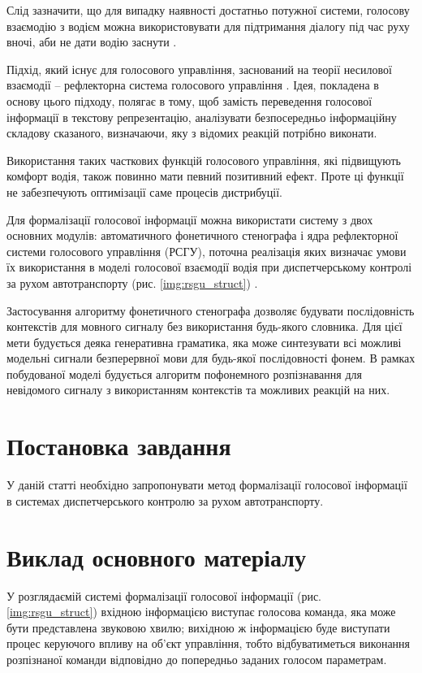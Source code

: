 Слід зазначити, що для випадку наявності достатньо потужної системи, голосову взаємодію з водієм можна використовувати для підтримання діалогу під час руху вночі, аби не дати водію заснути \cite{Kravchenko_2012}.

Підхід, який існує для голосового управління, заснований на теорії несилової взаємодії \cite{Teslia_2010} – рефлекторна система голосового управління \cite{Egorchenkov_2016,Pylypenko_2009}. Ідея, покладена в основу цього підходу, полягає в тому, щоб замість переведення голосової інформації в текстову репрезентацію, аналізувати безпосередньо інформаційну складову сказаного, визначаючи, яку з відомих реакцій потрібно виконати.

Використання таких часткових функцій голосового управління, які підвищують комфорт водія, також повинно мати певний позитивний ефект. Проте ці функції не забезпечують оптимізації саме процесів дистрибуції.

Для формалізації голосової інформації можна використати систему з двох основних модулів: автоматичного фонетичного стенографа і ядра рефлекторної системи голосового управління (РСГУ), поточна реалізація яких визначає умови їх використання в моделі голосової взаємодії водія при диспетчерському контролі за рухом автотранспорту (рис. \ref{img:rsgu_struct}) \cite{Teslia_2014,Teslia_2013}.

Застосування алгоритму фонетичного стенографа дозволяє будувати послідовність контекстів для мовного сигналу без використання будь-якого словника. Для цієї мети будується деяка генеративна граматика, яка може синтезувати всі можливі модельні сигнали безперервної мови для будь-якої послідовності фонем. В рамках побудованої моделі будується алгоритм пофонемного розпізнавання для невідомого сигналу з використанням контекстів та можливих реакцій на них.

\section{Постановка завдання}

У даній статті необхідно запропонувати метод формалізації голосової інформації в системах диспетчерського контролю за рухом автотранспорту.

\section{Виклад основного матеріалу}

У розглядаємій системі формалізації голосової інформації (рис. \ref{img:rsgu_struct}) вхідною інформацією виступає голосова команда, яка може бути представлена звуковою хвилю; вихідною ж інформацією буде виступати процес керуючого впливу на об’єкт управління, тобто відбуватиметься виконання розпізнаної команди відповідно до попередньо заданих голосом параметрам.

